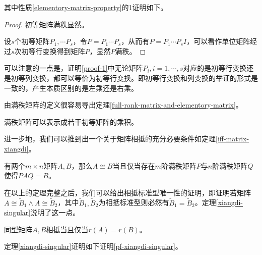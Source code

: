 其中性质\ref{elementory-matrix-property}的1证明如下。
\begin{proof}
    \label{proof-1}
    初等矩阵满秩显然。

    设$s$个初等矩阵$P_1,\cdots P_s$，令$P=P_1\cdots P_s$，从而有$P=P_1\cdots P_sI$，可以看作单位矩阵经过$s$次初等行变换得到矩阵$P$，显然$P$满秩。
\end{proof}

\begin{remark}
    可以注意的一点是，证明\ref{proof-1}中无论矩阵$P_i,i=1,\cdots,s$对应的是初等行变换还是初等列变换，都可以等价为初等行变换。即初等行变换和列变换的举证的形式是一致的，产生本质区别的是左乘还是右乘。
\end{remark}

由满秩矩阵的定义很容易导出定理\ref{full-rank-matrix-and-elementory-matrix}。

\begin{thm}
    \label{full-rank-matrix-and-elementory-matrix}
    满秩矩阵可以表示成若干初等矩阵的乘积。
\end{thm}

进一步地，我们可以推到出一个关于矩阵相抵的充分必要条件如定理\ref{iff-matrix-xiangdi}。

\begin{thm}
    \label{iff-matrix-xiangdi}
    有两个$m\times n$矩阵$A,B$，那么$A\cong B$当且仅当存在$m$阶满秩矩阵$P$与$n$阶满秩矩阵$Q$使得$PAQ=B$。
\end{thm}

在以上的定理完整之后，我们可以给出相抵标准型唯一性的证明，即证明若矩阵$A\cong \tilde{B}_1\wedge A\cong\tilde{B}_2$，其中$\tilde{B}_1,\tilde{B}_2$为相抵标准型则必然有$\tilde{B}_1=\tilde{B}_2$。定理\ref{xiangdi-singular}说明了这一点。

\begin{thm}
    \label{xiangdi-singular}
    同型矩阵$A,B$相抵当且仅当$r(A)=r(B)$。
\end{thm}

定理\ref{xiangdi-singular}证明如下证明\ref{pf-xiangdi-singular}。

